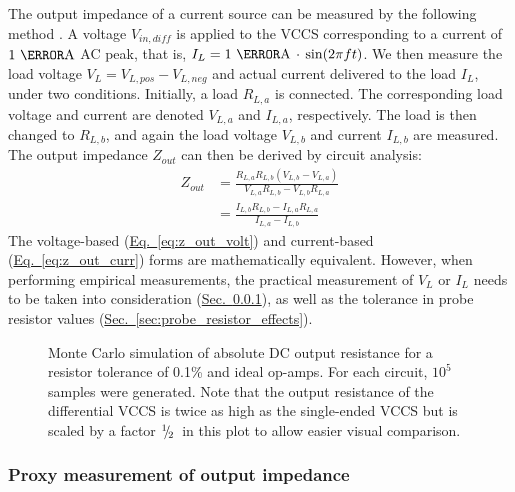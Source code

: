 \documentclass[conference]{IEEEtran}
\newcommand{\briefeqlink}[1]{\hyperref[#1]{Eq.~\ref*{#1}}\xspace }
\newcommand{\briefseclink}[1]{\hyperref[#1]{Sec.~\ref*{#1}}}
\newcommand{\vulgaronehalf}{${}^1\!\!\mskip0.3\thinmuskip/\!{}_2$}
\begin{document}
The output impedance of a current source can be measured by the following method \cite{pmid24880419}. A voltage $V_{in,dif\!f}$ is applied to the VCCS corresponding to a current of $1~\milli\ampere$ AC peak, that is, $I_L=1~\milli\ampere\,\cdot\,\sin(2\pi{}ft)$. We then measure the load voltage $V_L=V_{L,pos}-V_{L,neg}$ and actual current delivered to the load $I_L$, under two conditions. Initially, a load $R_{L,a}$ is connected. The corresponding load voltage and current are denoted $V_{L,a}$ and $I_{L,a}$, respectively. The load is then changed to $R_{L,b}$, and again the load voltage $V_{L,b}$ and current $I_{L,b}$ are measured. The output impedance $Z_{out}$ can then be derived by circuit analysis:
\begin{subequations}
\label{eq:z_out}
\begin{align}
Z_{out} &= \frac{R_{L,a} R_{L,b} (V_{L,b} - V_{L,a})} {V_{L,a}R_{L,b} - V_{L,b} R_{L,a}} \label{eq:z_out_volt} \\
& = \frac{I_{L,b} R_{L,b} - I_{L,a} R_{L,a}} {I_{L,a} - I_{L,b}} \label{eq:z_out_curr}
\end{align}
\end{subequations}
The voltage-based (\briefeqlink{eq:z_out_volt}) and current-based (\briefeqlink{eq:z_out_curr}) forms are mathematically equivalent. However, when performing empirical measurements, the practical measurement of $V_L$ or $I_L$ needs to be taken into consideration (\briefseclink{sec:proxy_output_impedance}), as well as the tolerance in probe resistor values (\briefseclink{sec:probe_resistor_effects}).

\begin{figure}[t!]
\hspace{-4.7cm}
\caption{\small Monte Carlo simulation of absolute DC output resistance for a resistor tolerance of 0.1\% and ideal op-amps. For each circuit, $10^5$ samples were generated. Note that the output resistance of the differential VCCS is twice as high as the single-ended VCCS but is scaled by a factor \vulgaronehalf~in this plot to allow easier visual comparison.}
\label{fig:mc_output_resistance}
\end{figure}

\subsubsection{Proxy measurement of output impedance}
\label{sec:proxy_output_impedance}
\end{document}
